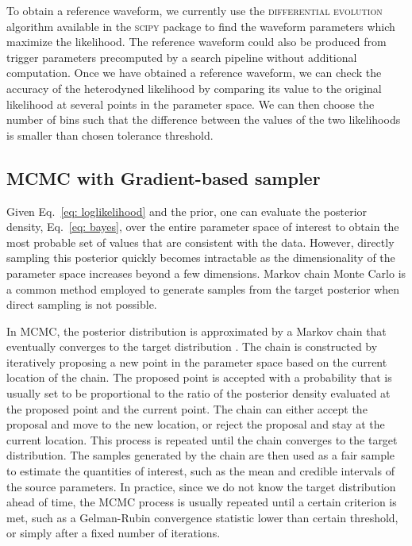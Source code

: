 \documentclass[twocolumn]{aastex631}
\newcommand{\te}[1]{\textbf{\color{pyRed}(TE: #1)}}
\begin{document}

To obtain a reference waveform, we currently use the \textsc{differential
evolution} algorithm \citep{Storn1997DifferentialE} available in the
\textsc{scipy} package \citep{2020SciPy-NMeth} to find the waveform parameters
which maximize the likelihood.  The reference waveform could also be produced
from trigger parameters precomputed by a search pipeline without additional
computation. Once we have obtained a reference waveform, we can check the accuracy
of the heterodyned likelihood by comparing its value to the original likelihood
at several points in the parameter space. We can then choose the number of bins such
that the difference between the values of the two likelihoods is smaller than
chosen tolerance threshold.

\subsection{MCMC with Gradient-based sampler}
\label{sec:gradient}

Given Eq.~\eqref{eq: loglikelihood} and the prior, one can evaluate the
posterior density, Eq.~\eqref{eq: bayes}, over the entire parameter space of
interest to obtain the most probable set of values that are consistent with the
data. However, directly sampling this posterior quickly becomes intractable as
the dimensionality of the parameter space increases beyond a few dimensions.
Markov chain Monte Carlo \citep{gelmanbda04} is a common method employed to
generate samples from the target posterior when direct sampling is not
possible.

In MCMC, the posterior distribution is approximated by a Markov chain that
eventually converges to the target distribution \citep{10.1214/aos/1176325750}.
The chain is constructed by iteratively proposing a new point in the
parameter space based on the current location of the chain. The proposed point
is accepted with a probability that is usually set to be proportional to the
ratio of the posterior density evaluated at the proposed point and the current
point. The chain can either accept the proposal and move to the new location,
or reject the proposal and stay at the current location. This process is
repeated until the chain converges to the target distribution. The samples
generated by the chain are then used as a fair sample to estimate the
quantities of interest, such as the mean and credible intervals of the source
parameters. In practice, since we do not know the target distribution ahead of
time, the MCMC process is usually repeated until a certain criterion is met,
such as a Gelman-Rubin convergence statistic \citep{10.2307/2246093} lower than
certain threshold, or simply after a fixed number of iterations.
\end{document}
